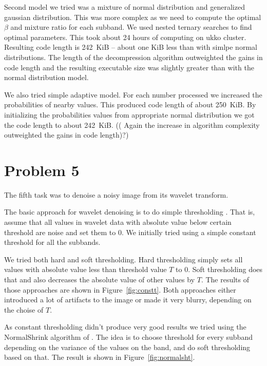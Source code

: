 \documentclass{article}
\begin{document}
Second model we tried was a mixture of normal distribution and generalized gaussian distribution. This was more complex
as we need to compute the optimal $\beta$ and mixture ratio for each subband. We used nested ternary searches to find optimal parameters.
This took about 24 hours of computing on ukko cluster. Resulting code length is 242~KiB -- about one KiB less than with simlpe normal distributions.
The length of the decompression algorithm outweighted the gains in code length and the resulting executable size was slightly
greater than with the normal distribution model.

We also tried simple adaptive model. For each number processed we increased the probabilities of nearby values. This produced code length of about 250~KiB.
By initializing the probabilities values from appropriate normal distribution we got the code length to about 242~KiB.
(( Again the increase in algorithm complexity outweighted the gains in code length)?)

\section{Problem 5}

The fifth task was to denoise a noisy image from its wavelet transform.

The basic approach for wavelet denoising is to do simple thresholding \cite{rvs02}. That is, assume that all values in wavelet data with absolute value below certain threshold are noise and set them to 0. We initially tried using a simple constant threshold for all the subbands.

We tried both hard and soft thresholding. Hard thresholding simply sets all values with absolute value less than threshold value $T$ to 0. Soft thresholding does that and also decreases the absolute value of other values by $T$. The results of those approaches are shown in Figure~\ref{fig:constt}. Both approaches either introduced a lot of artifacts to the image or made it very blurry, depending on the choise of $T$.

As constant thresholding didn't produce very good results we tried using the NormalShrink algorithm of \cite{ksc02}. The idea is to choose threshold for every subband depending on the variance of the values on the band, and do soft thresholding based on that. The result is shown in Figure~\ref{fig:normalsht}.
\end{document}
